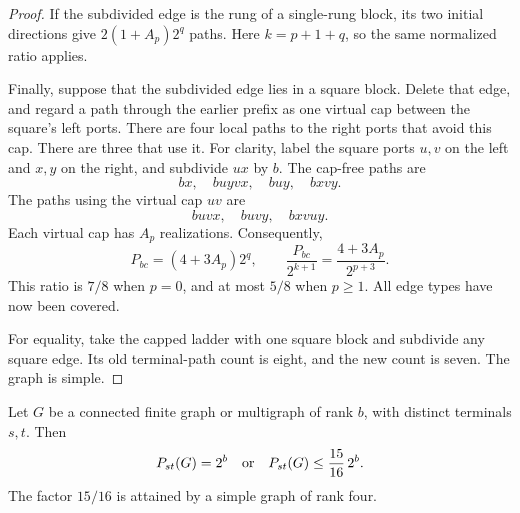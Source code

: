 \begin{proof}
If the subdivided edge is the rung of a single-rung block, its two initial directions give
$2(1+A_p)2^q$ paths.
Here $k=p+1+q$, so the same normalized ratio applies.

Finally, suppose that the subdivided edge lies in a square block.
Delete that edge, and regard a path through the earlier prefix as one virtual cap between the square's left ports.
There are four local paths to the right ports that avoid this cap.
There are three that use it.
For clarity, label the square ports $u,v$ on the left and $x,y$ on the right, and subdivide $ux$ by $b$.
The cap-free paths are
\[
 bx,\quad bu yv x,\quad bu y,\quad bx v y.
\]
The paths using the virtual cap $uv$ are
\[
 bu v x,\quad bu v y,\quad bx v u y.
\]
Each virtual cap has $A_p$ realizations.
Consequently,
\[
 P_{bc}=(4+3A_p)2^q,
 \qquad
 \frac{P_{bc}}{2^{k+1}}=\frac{4+3A_p}{2^{p+3}}.
\]
This ratio is $7/8$ when $p=0$, and at most $5/8$ when $p\ge1$.
All edge types have now been covered.

For equality, take the capped ladder with one square block and subdivide any square edge.
Its old terminal-path count is eight, and the new count is seven.
The graph is simple.
\end{proof}

\begin{theorem}\label{thm:terminal-path-saturation-gap}
Let $G$ be a connected finite graph or multigraph of rank $b$, with distinct terminals $s,t$.
Then
\[
 P_{st}(G)=2^b
 \quad\hbox{or}\quad
 P_{st}(G)\le\frac{15}{16}\,2^b.
\]
The factor $15/16$ is attained by a simple graph of rank four.
\end{theorem}

